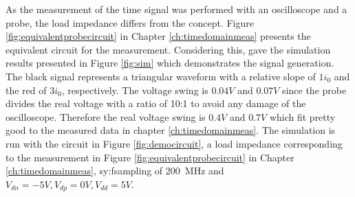 As the measurement of the time signal was performed with an oscilloscope and a probe, the load impedance differs from the concept.
Figure \ref{fig:equivalentprobecircuit} in Chapter \ref{ch:timedomainmeas} presents the equivalent circuit for the measurement.
Considering this, gave the simulation results presented in Figure \ref{fig:sim} which demonstrates the signal generation.
The black signal represents a triangular waveform with a relative slope of $1 i_0$ and the red of $3 i_0$, respectively.
The voltage swing is $0.04 V$ and $0.07 V$ since the probe divides the real voltage with a ratio of 10:1 to avoid any damage of the oscilloscope.
Therefore the real voltage swing is $0.4 V$ and $0.7V$ which fit pretty good to the measured data in chapter \ref{ch:timedomainmeas}.
The simulation is run with the circuit in Figure \ref{fig:democircuit}, a load impedance corresponding to the measurement in Figure \ref{fig:equivalentprobecircuit} in Chapter \ref{ch:timedomainmeas}, \gls{sy:fsampling} of \SI{200}{\mega \hertz} and $V_{dn} = -5V, V_{dp} = 0V, V_{dd} = 5V$.

\newpage
